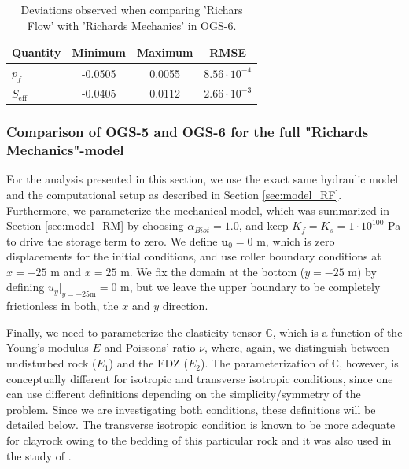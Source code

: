 \begin{table}
 \caption{Deviations observed when comparing 'Richars Flow' with 'Richards Mechanics' in OGS-6.\label{tab:richards_mechanics}}
\begin{center}
\begin{tabular}{ l | c | c | c }
 Quantity			& Minimum 	& Maximum	 & RMSE  \\
 \hline
 $p_f$ & -0.0505 	& 0.0055	& $8.56\cdot 10^{-4}$\\ 
 $S_\text{eff}$	 	& -0.0405 & 0.0112	& $2.66\cdot 10^{-3}$\\		
\end{tabular}
\end{center}
\end{table}


\subsubsection{Comparison of OGS-5 and OGS-6 for the full "Richards Mechanics"-model}\label{sec:full_RM}
For the analysis presented in this section, we use the exact same hydraulic model and the computational setup as described in Section \ref{sec:model_RF}. Furthermore, we parameterize the mechanical model, which was summarized in Section \ref{sec:model_RM} by choosing $\alpha_{Biot}=1.0$, and keep $K_f=K_s=1\cdot 10^{100}$ Pa to drive the storage term to zero. We define $\textbf{u}_0=0$ m, which is zero displacements for the initial conditions, and use roller boundary conditions at $x=-25$ m and $x=25$ m. We fix the domain at the bottom ($y=-25$ m) by defining $u_y\rvert_{y=-25\text{m}}=0$ m, but we leave the upper boundary to be completely frictionless in both, the $x$ and $y$ direction.

Finally, we need to parameterize the elasticity tensor $\mathds{C}$, which is a function of the Young's modulus $E$ and Poissons' ratio $\nu$, where, again, we distinguish between undisturbed rock ($E_1$) and the EDZ ($E_2$). The parameterization of $\mathds{C}$, however, is conceptually different for isotropic and transverse isotropic conditions, since one can use different definitions depending on the simplicity/symmetry of the problem. Since we are investigating both conditions, these definitions will be detailed below. The transverse isotropic condition is known to be more adequate for clayrock owing to the bedding of this particular rock and it was also used in the study of \cite{ziefle2018}.

